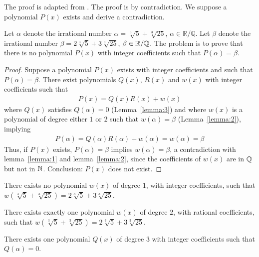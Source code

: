 
The proof is adapted from \cite{j23:2013}. The proof is by contradiction. We suppose a polynomial $P(x)$ exists and derive a contradiction.

Let $\alpha$ denote the irrational number $\alpha=\sqrt[3]{5}+\sqrt[3]{25}$, $\alpha\in\mathbb{R}/\mathbb{Q}$. Let $\beta$ denote the irrational number $\beta=2\sqrt[3]{5}+3\sqrt[3]{25}$, $\beta\in\mathbb{R}/\mathbb{Q}$. 
The problem is to prove that there is no polynomial $P(x)$ with integer coeﬀicients such that $P(\alpha)=\beta$.

\begin{proof}
Suppose a polynomial $P(x)$ exists with integer coefficients and such that $P(\alpha)=\beta$. There exist polynomials $Q(x)$, $R(x)$ and $w(x)$ with integer coefficients such that 
\begin{align*}
P(x) = Q(x) R(x) + w(x)
\end{align*}
where $Q(x)$ satisfies $Q(\alpha)=0$ (Lemma~\ref{lemma:3}) and where $w(x)$ is a polynomial of degree either $1$ or $2$ such that $w(\alpha)=\beta$ (Lemma~\ref{lemma:2}), implying
\begin{align*}
P(\alpha) 
= Q(\alpha) R(\alpha) + w(\alpha) 
= w(\alpha)
= \beta
\end{align*}
Thus, if $P(x)$ exists, $P(\alpha)=\beta$ implies $w(\alpha)=\beta$, a contradiction with lemma~\ref{lemma:1} and lemma~\ref{lemma:2}, since the coefficients of $w(x)$ are in $\mathbb{Q}$ but not in $\mathbb{N}$. Conclusion: $P(x)$ does not exist.
\end{proof}

\begin{lemma}\label{lemma:1}
There exists no polynomial $w(x)$ of degree $1$, with integer coefficients, such that $w(\sqrt[3]{5}+\sqrt[3]{25})=2\sqrt[3]{5}+3\sqrt[3]{25}$.
\end{lemma}

\begin{lemma}\label{lemma:2}
There exists exactly one polynomial $w(x)$ of degree $2$, with rational coefficients, such that $w(\sqrt[3]{5}+\sqrt[3]{25})=2\sqrt[3]{5}+3\sqrt[3]{25}$.
\end{lemma}

\begin{lemma}\label{lemma:3}
There exists one polynomial $Q(x)$ of degree $3$ with integer coefficients such that $Q(\alpha)=0$.
\end{lemma}


